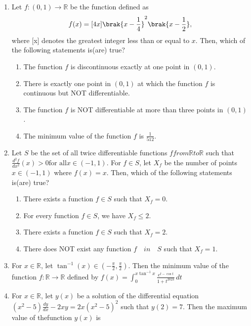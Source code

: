 \documentclass[12pt,a4paper]{article}
\begin{document}
\begin{enumerate}
\item Let $f : (0,1) \to \mathbb{R}$ be the function defined as
$$ f(x) =  [4x] \brak{x-\frac{1}{4}}^2 \brak{x-\frac{1}{2}}, $$ where [x] denotes the greatest integer less than or equal to $x.$
Then, which of the following statements is(are) true?
\begin{enumerate}[label=\Alph*.]
\item The function $f$ is discontinuous exactly at one point in $(0,1)$.
\item There is exactly one point in $(0,1)$ at which the function $f$ is continuous but NOT differentiable.
\item The function $f$ is NOT differentiable at more than three points in $(0,1)$.
\item The minimum value of the function $f$ is $\frac{1}{512}$.
\end{enumerate}


\item Let $S$ be the set of all twice differentiable functions $f from \mathbb{R} to \mathbb{R}$ such that $ \frac{d^2 f}{dx^2}(x) > 0  \text{for all}  x \in (-1, 1).$ For $f \in S$, let ${X_{f}}$ be the number of points $x \in (-1, 1)$ where $f(x) = x$. Then, which of the following statements is(are) true?
\begin{enumerate}[label=\Alph*.]
\item There exists a function $f \in S$ such that ${X_{f}} = 0$.
\item For every function $f \in S$, we have ${X_{f}} \leq 2$.
\item There exists a function $f \in S$ such that ${X_{f}} = 2$.
\item There does NOT exist any function $f \quad in \quad S$ such that ${X_{f}} = 1$.
\end{enumerate}

\vspace{0.5cm}
\item For $x \in \mathbb{R}$, let $\tan^{-1}(x) \in \left( -\frac{\pi}{2}, \frac{\pi}{2} \right).$ Then the minimum value of the function $f: \mathbb{R} \to \mathbb{R}$ defined by $f(x) =  \int_0^{x\tan^{-1}x} \frac{e^{t-\cos t}}{1+t^{2023}}\, dt$

\vspace{0.5cm}
\item For $x \in \mathbb{R}$, let $y(x)$ be a solution of the differential equation $ (x^2 - 5) \frac{dy}{dx} - 2xy = 2x{(x^2 - 5)^2}$  such that $y(2) = 7$. Then the maximum value of thefunction $y(x)$ is


\end{enumerate}
\end{document}

